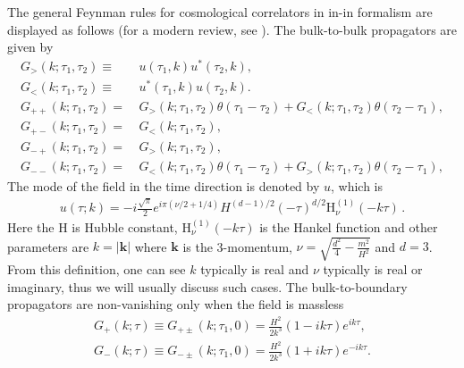 \documentclass[a4paper,11pt]{article}
\newcommand{\nn}{\nonumber}
\begin{document}
The general Feynman rules for cosmological correlators in in-in formalism are displayed as follows (for a modern review, see \cite{Chen:2017ryl}). The bulk-to-bulk propagators are given by
\begin{align}
G_>(k;\tau_1,\tau_2)\equiv&~u(\tau_1,k)u^*(\tau_2,k),\nn\\
G_<(k;\tau_1,\tau_2)\equiv&~u^{*}(\tau_1,k)u(\tau_2,k).\\
G_{++}(k;\tau_1,\tau_2)=&~G_>(k;\tau_1,\tau_2)\theta(\tau_1-\tau_2)+G_<(k;\tau_1,\tau_2)\theta(\tau_2-\tau_1),\nn\\
G_{+-}(k;\tau_1,\tau_2)=&~G_<(k;\tau_1,\tau_2),\nn\\
G_{-+}(k;\tau_1,\tau_2)=&~G_>(k;\tau_1,\tau_2),\nn\\
G_{--}(k;\tau_1,\tau_2)=&~G_<(k;\tau_1,\tau_2)\theta(\tau_1-\tau_2)+G_>(k;\tau_1,\tau_2)\theta(\tau_2-\tau_1),  \label{eq:proptype}
\end{align}
The mode of the field in the time direction is denoted by $u$, which is
\begin{align}
  u(\tau;k)=-i\frac{\sqrt\pi}{2}e^{i\pi(\nu/2+1/4)}H^{(d-1)/2}(-\tau)^{d/2}\text{H}_{\nu}^{(1)}(-k\tau) \,.
\end{align}
Here the H is Hubble constant, $\text{H}_{\nu}^{(1)}(-k\tau)$ is the Hankel function and other parameters are 
$k=|\bm{k}|$ where $\bm{k}$ is the 3-momentum, $\nu=\sqrt{\frac{d^2}{4}-\frac{m^2}{H^2}}$ and $d=3$.  From this definition, one can see $k$ typically is real and $\nu$ typically is real or imaginary, thus we will usually discuss such cases.
The bulk-to-boundary propagators are non-vanishing only when the field is massless
\begin{align}
G_{+}(k;\tau)\equiv G_{+\pm}(k;\tau_1,0)=\frac{H^2}{2k^3}(1-ik\tau)e^{ik\tau} ,\nn\\
G_{-}(k;\tau)\equiv G_{-\pm}(k;\tau_1,0)=\frac{H^2}{2k^3}(1+ik\tau)e^{-ik\tau} .
\end{align}
\end{document}
